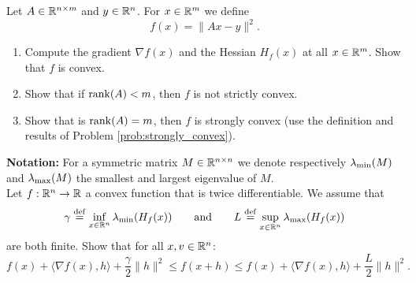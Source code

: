 \documentclass[11pt,nocut]{article}
\begin{document}
\vspace{1mm}

\begin{problem}[3 points]
	Let $A \in \mathbb{R}^{n \times m}$ and $y \in \mathbb{R}^n$.
	For $x \in \mathbb{R}^m$ we define
	$$
	f(x) = \|Ax-y\|^2.
	$$
	\begin{enumerate}[label=\normalfont(\textbf{\alph*})]
		\item Compute the gradient $\nabla f(x)$ and the Hessian $H_f(x)$ at all $x \in \mathbb{R}^m$. Show that $f$ is convex.
		\item Show that if ${{\rm rank}}(A)<m$, then $f$ is not strictly convex.
		\item Show that is ${{\rm rank}}(A)=m$, then $f$ is strongly convex (use the definition and results of Problem \ref{prob:strongly_convex}).
	\end{enumerate}
\end{problem}

\vspace{1mm}

\begin{problem}[$\star$]
	\textbf{Notation:} For a symmetric matrix $M \in \mathbb{R}^{n \times n}$ we denote respectively $\lambda_{\rm min}(M)$ and $\lambda_{\rm max}(M)$ the smallest and largest eigenvalue of $M$.
	\\

	Let $f: \mathbb{R}^n \to \mathbb{R}$ a convex function that is twice differentiable. We assume that 
	$$
	\gamma \overset{\rm def}{=} \inf_{x \in \mathbb{R}^n} \lambda_{\rm min}(H_f(x))
	\qquad \text{and} \qquad
	L \overset{\rm def}{=} \sup_{x \in \mathbb{R}^n} \lambda_{\rm max}(H_f(x))
	$$
	are both finite. Show that for all $x,v \in \mathbb{R}^n$:
	$$
	f(x) + \langle \nabla f(x), h \rangle + \frac{\gamma}{2} \|h\|^2
	\leq f(x+h)
	\leq
	f(x) + \langle \nabla f(x), h \rangle + \frac{L}{2} \|h\|^2.
	$$

\end{problem}

\vspace{1cm}
\centerline{}

%
%
\end{document}
